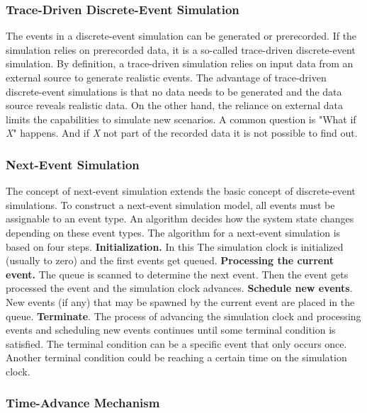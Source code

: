 \subsubsection{Trace-Driven Discrete-Event Simulation}

The events in a discrete-event simulation can be generated or prerecorded. If the simulation relies on prerecorded data, it is a so-called trace-driven discrete-event simulation.
By definition, a trace-driven simulation relies on input data from an external source to generate realistic events. \cite{leemis2006discrete} The advantage of trace-driven discrete-event simulations is that no data needs to be generated and the data source reveals realistic data. On the other hand, the reliance on external data limits the capabilities to simulate new scenarios. A common question is "What if \textit{X}" happens. And if \textit{X} not part of the recorded data it is not possible to find out.


\subsubsection{Next-Event Simulation}

The concept of next-event simulation extends the basic concept of discrete-event simulations. To construct a next-event simulation model, all events must be assignable to an event type. An algorithm decides how the system state changes depending on these event types.
\cite[chapter 5]{leemis2006discrete}
The algorithm for a next-event simulation is based on four steps.
\textbf{Initialization.} In this The simulation clock is initialized (usually to zero) and the first events get queued.
\textbf{Processing the current event.} The queue is scanned to determine the next event. Then the event gets processed the event and the simulation clock advances.
\textbf{Schedule new events}. New events (if any) that may be spawned by the current event are placed in the queue.
\textbf{Terminate}. The process of advancing the simulation clock and processing events and scheduling new events continues until some terminal condition is satisfied. The terminal condition can be a specific event that only occurs once. Another terminal condition could be reaching a certain time on the simulation clock.


\subsubsection{Time-Advance Mechanism}
\label{des:timeadvance}

